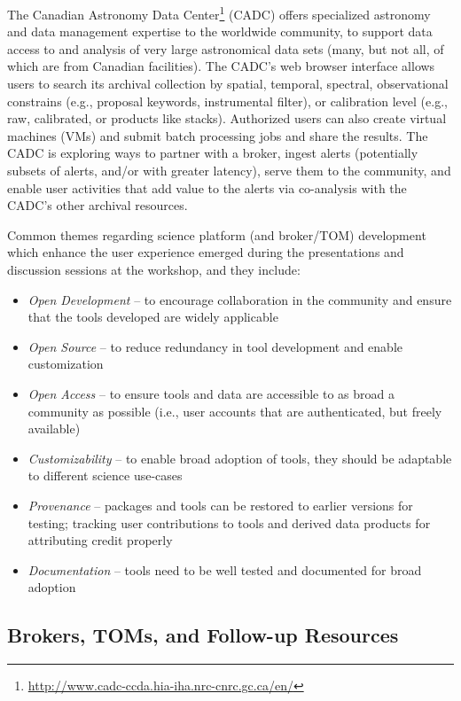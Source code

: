 The Canadian Astronomy Data \gls{Center}\footnote{\url{http://www.cadc-ccda.hia-iha.nrc-cnrc.gc.ca/en/}} (\gls{CADC}) offers specialized astronomy and data management expertise to the worldwide community, to support data access to and analysis of very large astronomical data sets (many, but not all, of which are from Canadian facilities).
The \gls{CADC}'s web browser interface allows users to search its archival collection by spatial, temporal, spectral, observational constrains (e.g., proposal keywords, instrumental filter), or \gls{calibration} level (e.g., raw, calibrated, or products like stacks).
Authorized users can also create virtual machines (VMs) and submit batch processing jobs and share the results.
The \gls{CADC} is exploring ways to partner with a broker, ingest alerts (potentially subsets of alerts, and/or with greater latency), serve them to the community, and enable user activities that add value to the alerts via co-analysis with the \gls{CADC}'s other archival resources.

Common themes regarding science platform (and broker/TOM) development which enhance the user experience emerged during the presentations and discussion sessions at the workshop, and they include:
\begin{itemize}
\item {\it Open Development} -- to encourage collaboration in the community and ensure that the tools developed are widely applicable
\item {\it Open \gls{Source}} -- to reduce redundancy in tool development and enable customization
\item {\it Open Access} -- to ensure tools and data are accessible to as broad a community as possible (i.e., user accounts that are authenticated, but freely available)
\item {\it Customizability} -- to enable broad adoption of tools, they should be adaptable to different science use-cases
\item {\it Provenance} -- packages and tools can be restored to earlier versions for testing; tracking user contributions to tools and derived data products for attributing credit properly
\item {\it Documentation} -- tools need to be well tested and documented for broad adoption
\end{itemize}

\subsection{Brokers, TOMs, and Follow-up Resources}\label{ssec:interfaces_brokers}

